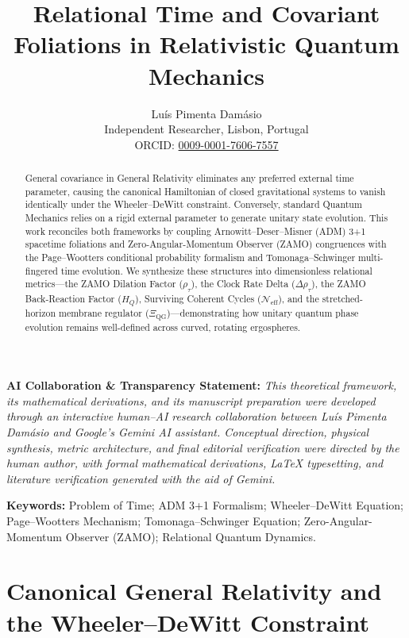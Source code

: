 \documentclass[11pt,a4paper]{article}
\title{\textbf{Relational Time and Covariant Foliations in Relativistic Quantum Mechanics}}
\author{Luís {Pimenta Damásio}\\
\small Independent Researcher, Lisbon, Portugal\\
\small ORCID: \href{https://orcid.org/0009-0001-7606-7557}{0009-0001-7606-7557}}
\date{}
\begin{document}
\maketitle

\begin{framed}
\noindent\textbf{AI Collaboration \& Transparency Statement:} \textit{This theoretical framework, its mathematical derivations, and its manuscript preparation were developed through an interactive human--AI research collaboration between Luís Pimenta Damásio and Google's Gemini AI assistant. Conceptual direction, physical synthesis, metric architecture, and final editorial verification were directed by the human author, with formal mathematical derivations, LaTeX typesetting, and literature verification generated with the aid of Gemini.}
\end{framed}

\begin{abstract}
General covariance in General Relativity eliminates any preferred external time parameter, causing the canonical Hamiltonian of closed gravitational systems to vanish identically under the Wheeler--DeWitt constraint. Conversely, standard Quantum Mechanics relies on a rigid external parameter to generate unitary state evolution. This work reconciles both frameworks by coupling Arnowitt--Deser--Misner (ADM) 3+1 spacetime foliations and Zero-Angular-Momentum Observer (ZAMO) congruences with the Page--Wootters conditional probability formalism and Tomonaga--Schwinger multi-fingered time evolution. We synthesize these structures into dimensionless relational metrics---the ZAMO Dilation Factor ($\rho_\tau$), the Clock Rate Delta ($\Delta\rho_\tau$), the ZAMO Back-Reaction Factor ($H_Q$), Surviving Coherent Cycles ($\mathcal{N}_{\text{eff}}$), and the stretched-horizon membrane regulator ($\Xi_{\text{QG}}$)---demonstrating how unitary quantum phase evolution remains well-defined across curved, rotating ergospheres.
\end{abstract}

\noindent\textbf{Keywords:} Problem of Time; ADM 3+1 Formalism; Wheeler--DeWitt Equation; Page--Wootters Mechanism; Tomonaga--Schwinger Equation; Zero-Angular-Momentum Observer (ZAMO); Relational Quantum Dynamics.

\section{Canonical General Relativity and the Wheeler--DeWitt Constraint}
\end{document}
